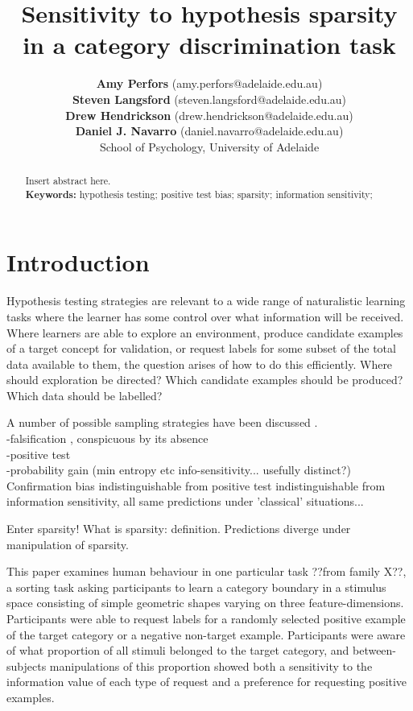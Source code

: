 \documentclass[10pt,letterpaper]{article}
\title{Sensitivity to hypothesis sparsity in a category discrimination task}
\author{{\bf Amy Perfors} (amy.perfors@adelaide.edu.au) \\
   {\bf Steven Langsford} (steven.langsford@adelaide.edu.au) \\
   {\bf Drew Hendrickson} (drew.hendrickson@adelaide.edu.au) \\
   {\bf Daniel J. Navarro} (daniel.navarro@adelaide.edu.au) \\
   School of Psychology, University of Adelaide}
\begin{document}
\maketitle


\begin{abstract}
Insert abstract here.\\

\textbf{Keywords:} 
hypothesis testing; positive test bias; sparsity; information sensitivity;
\end{abstract}


\section*{Introduction}
Hypothesis testing strategies are relevant to a wide range of naturalistic learning tasks where the learner has some control over what information will be received. Where learners are able to explore an environment, produce candidate examples of a target concept for validation, or request labels for some subset of the total data available to them, the question arises of how to do this efficiently\cite{settles09activelearnlitrev}. Where should exploration be directed? Which candidate examples should be produced? Which data should be labelled?

A number of possible sampling strategies have been discussed \cite{nelson2005usefulquestions}.\\ 
-falsification \cite{popper1959scidiscovery}, conspicuous by its absence \cite{wason1960failure}\\ 
-positive test \cite{klayman1987confirmation}\\
-probability gain (min entropy etc info-sensitivity... usefully distinct?)\cite{nelson2010probgain}\\

Confirmation bias indistinguishable from positive test indistinguishable from information sensitivity, all same predictions under 'classical' situations...

Enter sparsity! What is sparsity: definition. Predictions diverge under manipulation of sparsity.\cite{navarro2011sparsecat}

 This paper examines human behaviour in one particular task ??from family X??, a sorting task asking participants to learn a category boundary in a stimulus space consisting of simple geometric shapes varying on three feature-dimensions. Participants were able to request labels for a randomly selected positive example of the target category or a negative non-target example. Participants were aware of what proportion of all stimuli belonged to the target category, and between-subjects manipulations of this proportion showed both a sensitivity to the information value of each type of request and a preference for requesting positive examples.
\end{document}
